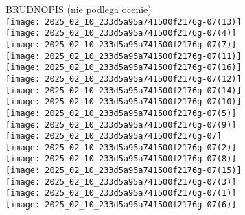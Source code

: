 \documentclass[10pt]{article}
\begin{document}
BRUDNOPIS (nie podlega ocenie)\\
\(\qquad\)\\
\texttt{[image: 2025\_02\_10\_233d5a95a741500f2176g-07(13)]}\\
\(\qquad\)\\
\texttt{[image: 2025\_02\_10\_233d5a95a741500f2176g-07(4)]}\\
\texttt{[image: 2025\_02\_10\_233d5a95a741500f2176g-07(7)]}\\
\texttt{[image: 2025\_02\_10\_233d5a95a741500f2176g-07(11)]}\\
\(\qquad\)\\
\texttt{[image: 2025\_02\_10\_233d5a95a741500f2176g-07(16)]}\\
\(\qquad\)\\
\(\qquad\)\\
\texttt{[image: 2025\_02\_10\_233d5a95a741500f2176g-07(12)]}\\
\texttt{[image: 2025\_02\_10\_233d5a95a741500f2176g-07(14)]}\\
\texttt{[image: 2025\_02\_10\_233d5a95a741500f2176g-07(10)]}\\
\texttt{[image: 2025\_02\_10\_233d5a95a741500f2176g-07(5)]}\\
\texttt{[image: 2025\_02\_10\_233d5a95a741500f2176g-07(9)]}\\
\(\qquad\)\\
\texttt{[image: 2025\_02\_10\_233d5a95a741500f2176g-07]}\\
\texttt{[image: 2025\_02\_10\_233d5a95a741500f2176g-07(2)]}\\
\texttt{[image: 2025\_02\_10\_233d5a95a741500f2176g-07(8)]}\\
\texttt{[image: 2025\_02\_10\_233d5a95a741500f2176g-07(15)]}\\
\(\qquad\)\\
\texttt{[image: 2025\_02\_10\_233d5a95a741500f2176g-07(3)]}\\
\texttt{[image: 2025\_02\_10\_233d5a95a741500f2176g-07(1)]}\\
\texttt{[image: 2025\_02\_10\_233d5a95a741500f2176g-07(6)]}
\end{document}
